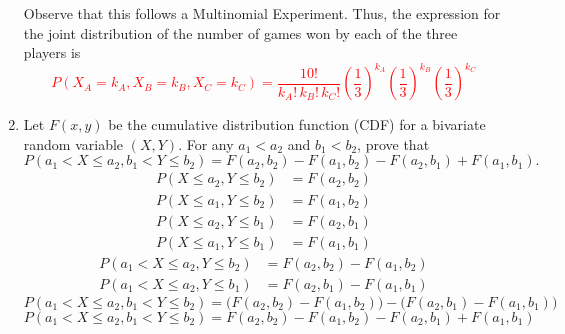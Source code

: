 \documentclass{article}
\begin{document}
\begin{enumerate}
Observe that this follows a Multinomial Experiment. Thus, the expression for the joint distribution of the number of games won by each of the three players is
\textcolor{red}{
\[
P(X_A = k_A, X_B = k_B, X_C = k_C) = \frac{10!}{k_A! \, k_B! \, k_C!} \left(\frac{1}{3}\right)^{k_A} \left(\frac{1}{3}\right)^{k_B} \left(\frac{1}{3}\right)^{k_C}
\]
}
\pagebreak
\item Let \( F(x, y) \) be the cumulative distribution function (CDF) for a bivariate random variable \( (X, Y) \). For any \( a_1 < a_2 \) and \( b_1 < b_2 \), prove that
\[
P(a_1 < X \leq a_2, b_1 < Y \leq b_2) = F(a_2, b_2) - F(a_1, b_2) - F(a_2, b_1) + F(a_1, b_1).
\]
\begin{align*}
P(X \leq a_2, Y \leq b_2) &= F(a_2, b_2) \\
P(X \leq a_1, Y \leq b_2) &= F(a_1, b_2) \\
P(X \leq a_2, Y \leq b_1) &= F(a_2, b_1) \\
P(X \leq a_1, Y \leq b_1) &= F(a_1, b_1)
\end{align*}
\begin{align*}
P(a_1 < X \leq a_2, Y \leq b_2) &= F(a_2, b_2) - F(a_1, b_2) \\
P(a_1 < X \leq a_2, Y \leq b_1) &= F(a_2, b_1) - F(a_1, b_1)
\end{align*}
\[
P(a_1 < X \leq a_2, b_1 < Y \leq b_2) = \big(F(a_2, b_2) - F(a_1, b_2)\big) - \big(F(a_2, b_1) - F(a_1, b_1)\big)
\]
\[
P(a_1 < X \leq a_2, b_1 < Y \leq b_2) = F(a_2, b_2) - F(a_1, b_2) - F(a_2, b_1) + F(a_1, b_1)
\]

\end{enumerate}
\end{document}
